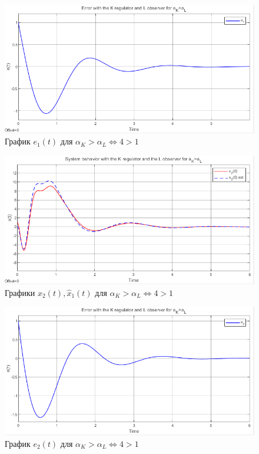 \documentclass[a4paper, 12pt]{article}
\begin{document}
    \begin{figure}[H]
        \centering
        \includegraphics[scale=0.8]{2task_aKgaL_e1.png}
        \captionsetup{skip=0pt}
        \caption{График $e_1(t)$ для $\alpha_K>\alpha_L\Leftrightarrow4>1$}
        \label{2task_aKgaL_e1}
    \end{figure}
    \newpage
    \vspace*{20mm}
    \begin{figure}[H]
        \centering
        \includegraphics[scale=0.8]{2task_aKgaL_x2.png}
        \captionsetup{skip=0pt}
        \caption{Графики $x_2(t),\hat{x}_1(t)$ для $\alpha_K>\alpha_L\Leftrightarrow4>1$}
        \label{2task_aKgaL_x2}
    \end{figure}
    \begin{figure}[H]
        \centering
        \includegraphics[scale=0.8]{2task_aKgaL_e2.png}
        \captionsetup{skip=0pt}
        \caption{График $e_2(t)$ для $\alpha_K>\alpha_L\Leftrightarrow4>1$}
        \label{2task_aKgaL_e2}
    \end{figure}
\end{document}
